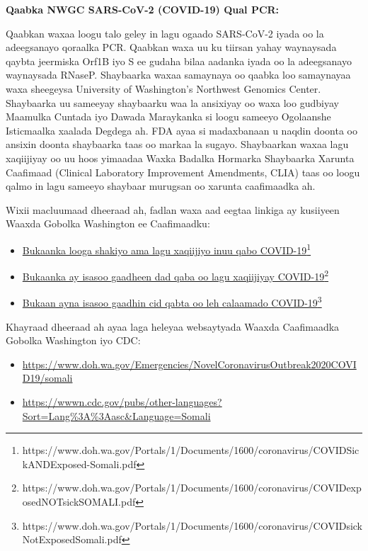 \documentclass[10pt]{article}
\newcommand{\link}[2]{\href{#1}{#2}\footnote{#1}}
\begin{document}
\bigskip
\textbf{Qaabka NWGC SARS-CoV-2 (COVID-19) Qual PCR:}

Qaabkan waxaa loogu talo geley in lagu ogaado SARS-CoV-2 iyada oo la adeegsanayo
qoraalka PCR. Qaabkan waxa uu ku tiirsan yahay waynaysada qaybta jeermiska Orf1B
iyo S ee gudaha bilaa aadanka iyada oo la adeegsanayo waynaysada RNaseP.
Shaybaarka waxaa samaynaya oo qaabka loo samaynayaa waxa sheegeysa University of
Washington’s Northwest Genomics Center.  Shaybaarka uu sameeyay shaybaarku waa
la ansixiyay oo waxa loo gudbiyay Maamulka Cuntada iyo Dawada Maraykanka si
loogu sameeyo Ogolaanshe Isticmaalka xaalada Degdega ah. FDA ayaa si madaxbanaan
u naqdin doonta oo ansixin doonta shaybaarka taas oo markaa la sugayo.
Shaybaarkan waxaa lagu xaqiijiyay oo uu hoos yimaadaa Waxka Badalka Hormarka
Shaybaarka Xarunta Caafimaad (Clinical Laboratory Improvement Amendments, CLIA)
taas oo loogu qalmo in lagu sameeyo shaybaar murugsan oo xarunta caafimaadka ah.

Wixii macluumaad dheeraad ah, fadlan waxa aad eegtaa linkiga ay kusiiyeen Waaxda
Gobolka Washington ee Caafimaadku:

\begin{itemize}
\item

  \link{https://www.doh.wa.gov/Portals/1/Documents/1600/coronavirus/COVIDSickANDExposed-Somali.pdf}{Bukaanka
  looga shakiyo ama lagu xaqiijiyo inuu qabo COVID-19}

\item

  \link{https://www.doh.wa.gov/Portals/1/Documents/1600/coronavirus/COVIDexposedNOTsickSOMALI.pdf}{Bukaanka
  ay isasoo gaadheen dad qaba oo lagu xaqiijiyay COVID-19}

\item

  \link{https://www.doh.wa.gov/Portals/1/Documents/1600/coronavirus/COVIDsickNotExposedSomali.pdf}{Bukaan
  ayna isasoo gaadhin cid qabta oo leh calaamado COVID-19}

\end{itemize}

Khayraad dheeraad ah ayaa laga heleyaa websaytyada Waaxda Caafimaadka Gobolka
Washington iyo CDC:

\begin{itemize}
\item

  \url{https://www.doh.wa.gov/Emergencies/NovelCoronavirusOutbreak2020COVID19/somali}

\item

  \url{https://wwwn.cdc.gov/pubs/other-languages?Sort=Lang%3A%3Aasc&Language=Somali}

\end{itemize}
\end{document}

